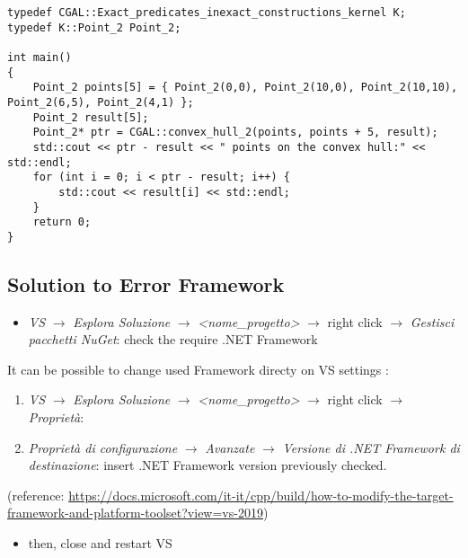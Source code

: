 \documentclass[11pt, english, openany]{report}
\begin{document}
\begin{appendices}
\begin{lstlisting}
typedef CGAL::Exact_predicates_inexact_constructions_kernel K;
typedef K::Point_2 Point_2;
    
int main()
{
	Point_2 points[5] = { Point_2(0,0), Point_2(10,0), Point_2(10,10), Point_2(6,5), Point_2(4,1) };
	Point_2 result[5];
	Point_2* ptr = CGAL::convex_hull_2(points, points + 5, result);
	std::cout << ptr - result << " points on the convex hull:" << std::endl;
	for (int i = 0; i < ptr - result; i++) {
		std::cout << result[i] << std::endl;
	}
	return 0;
}
\end{lstlisting}

\subsection{Solution to Error Framework}
\begin{itemize}
\item \textit{VS} $\rightarrow$ \textit{Esplora Soluzione} $\rightarrow$ \textit{<nome\_progetto>} $\rightarrow$ right click $\rightarrow$ \textit{Gestisci pacchetti NuGet}: check the require .NET Framework
\end{itemize}
It can be possible to change used Framework directy on VS settings :
\begin{enumerate}
\item \textit{VS} $\rightarrow$ \textit{Esplora Soluzione} $\rightarrow$ \textit{<nome\_progetto>} $\rightarrow$ right click $\rightarrow$ \textit{Proprietà}:
\item \textit{Proprietà di configurazione} $\rightarrow$ \textit{Avanzate} $\rightarrow$ \textit{Versione di .NET Framework di destinazione}: insert .NET Framework version previously checked.
\end{enumerate}
(reference: \href{https://docs.microsoft.com/it-it/cpp/build/how-to-modify-the-target-framework-and-platform-toolset?view=vs-2019}{https://docs.microsoft.com/it-it/cpp/build/how-to-modify-the-target-framework-and-platform-toolset?view=vs-2019})
\begin{itemize}
\item then, close and restart VS
\end{itemize}


\end{appendices}
\end{document}

